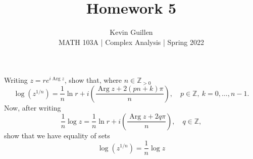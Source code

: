 \documentclass[11pt]{article}
\newenvironment{problem}[2][Problem\!]{\begin{trivlist}
\item[\hskip \labelsep {\bfseries #1}\hskip \labelsep {\bfseries #2}]}{\end{trivlist}}
\newcommand{\zz}{\mathbb Z}   %
\newcommand{\parg}{\operatorname{Arg}}
\begin{document}
 
\title{Homework 5}
\author{Kevin Guillen\\[0.5em]
MATH 103A | Complex Analysis | Spring 2022}
\date{} 
\maketitle


\begin{problem}{5.1}
Writing $z = re^{i\parg z}$, show that, where $n \in \zz_{>0}$
\[\log(z^{1/n}) = \frac{1}{n}\ln r + i\left(\frac{\parg z + 2(pn + k)\pi}{n}\right),\quad p\in\zz,\ k = 0,\ldots,n-1.\]
Now, after writing 
\[\frac{1}{n}\log z = \frac{1}{n}\ln r + i\left(\frac{\parg z + 2q\pi}{n}\right),\quad q \in \zz,\]
show that we have equality of sets
\[\log(z^{1/n}) = \frac{1}{n}\log z\]
\end{problem}
\end{document}
